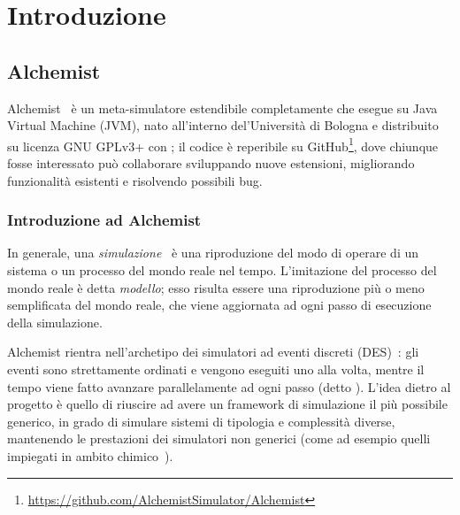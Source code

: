 

\chapter{Introduzione}\label{ch:intro}

    \section{Alchemist}\label{sec:alchemist}
        Alchemist~\cite{alchemistWeb, alchemist2013} è un meta-simulatore estendibile completamente  che esegue su Java Virtual Machine (JVM), nato all'interno del'Università di Bologna e distribuito su licenza GNU GPLv3+ con ; il codice è reperibile su GitHub\footnote{\url{https://github.com/AlchemistSimulator/Alchemist}}\label{fn:gh}, dove chiunque fosse interessato può collaborare sviluppando nuove estensioni, migliorando funzionalità esistenti e risolvendo possibili bug.

        \subsection{Introduzione ad Alchemist}\label{sub:introAlchemist}
            In generale, una \emph{simulazione}~\cite{des3} è una riproduzione del modo di operare di un sistema o un processo del mondo reale nel tempo.
            L'imitazione del processo del mondo reale è detta \emph{modello}; esso risulta essere una riproduzione più o meno semplificata del mondo reale, che viene aggiornata ad ogni passo di esecuzione della simulazione.

            Alchemist rientra nell'archetipo dei simulatori ad eventi discreti (DES)~\cite{des, des2}: gli eventi sono strettamente ordinati e vengono eseguiti uno alla volta, mentre il tempo viene fatto avanzare parallelamente ad ogni passo (detto ).
            L'idea dietro al progetto è quello di riuscire ad avere un framework di simulazione il più possibile generico, in grado di simulare sistemi di tipologia e complessità diverse, mantenendo le prestazioni dei simulatori non generici (come ad esempio quelli impiegati in ambito chimico~\cite{gillespie1976}).

